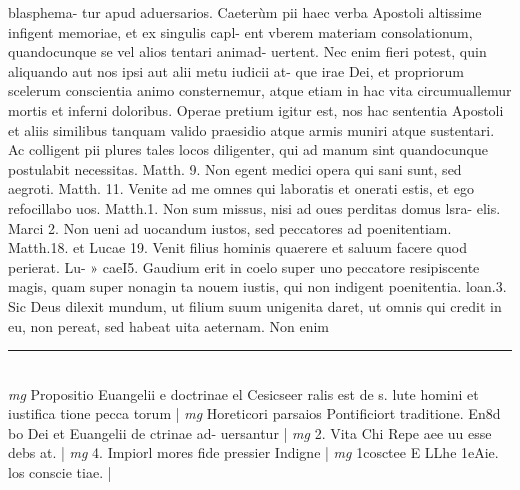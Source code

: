 \documentclass{article}
\begin{document}
\begin{pages}
blasphema- tur apud aduersarios.  \pend\pstart Caeterùm pii haec verba Apostoli altissime infigent memoriae, et ex singulis capl- ent vberem materiam consolationum, quandocunque se vel alios tentari animad- uertent. Nec enim fieri potest, quin aliquando aut nos ipsi aut alii metu iudicii at- que irae Dei, et propriorum scelerum conscientia animo consternemur, atque etiam in hac vita circumuallemur mortis et inferni doloribus. Operae pretium igitur est, nos hac sententia Apostoli et aliis similibus tanquam valido praesidio atque armis muniri atque sustentari. Ac colligent pii plures tales locos diligenter, qui ad manum sint quandocunque postulabit necessitas. Matth. 9. Non egent medici opera qui sani sunt, sed aegroti. Matth. 11. Venite ad me omnes qui laboratis et onerati estis, et ego refocillabo uos. Matth.1. Non sum missus, nisi ad oues perditas domus lsra- elis. Marci 2. Non ueni ad uocandum iustos, sed peccatores ad poenitentiam. Matth.18. et Lucae 19. Venit filius hominis quaerere et saluum facere quod perierat. Lu- » caeI5. Gaudium erit in coelo super uno peccatore resipiscente magis, quam super nonagin   ta nouem iustis, qui non indigent poenitentia. loan.3. Sic Deus dilexit mundum, ut filium suum   unigenita daret, ut omnis qui credit in eu, non pereat, sed habeat uita aeternam. Non enim  \pend
\vspace{0.5cm}\noindent
\vspace{0.2cm}\rule{1cm}{0.2pt}\\ 
\hspace{0.2cm}\textit{mg}
\footnotesize Propositio Euangelii e doctrinae el Cesicseer ralis est de s. lute homini et iustifica tione pecca torum 
\normalsize| 
\hspace{0.2cm}\textit{mg}
\footnotesize Horeticori parsaios Pontificiort traditione. En8d bo Dei et Euangelii de ctrinae ad- uersantur 
\normalsize| 
\hspace{0.2cm}\textit{mg}
\footnotesize 2. Vita Chi Repe aee uu esse debs at. 
\normalsize| 
\hspace{0.2cm}\textit{mg}
\footnotesize 4. Impiorl mores fide pressier Indigne 
\normalsize| 
\hspace{0.2cm}\textit{mg}
\footnotesize 1cosctee E LLhe 1eAie. los conscie tiae. 
\normalsize| 

\end{pages}
\end{document}
